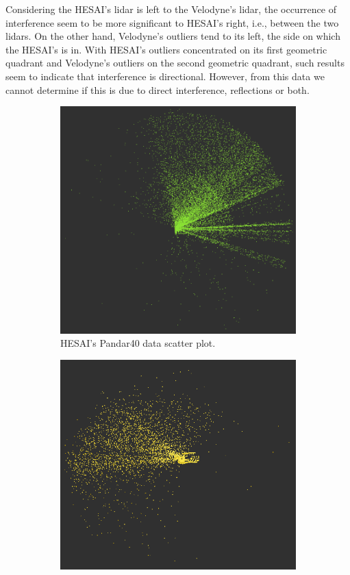 Considering the HESAI's \ac{lidar} is left to the Velodyne's \ac{lidar}, the occurrence of interference seem to be more significant to HESAI's right, i.e., between the two \acp{lidar}. On the other hand, Velodyne's outliers tend to its left, the side on which the HESAI's is in. With HESAI's outliers concentrated on its first geometric quadrant and Velodyne's outliers on the second geometric quadrant, such results seem to indicate that interference is directional. However, from this data we cannot determine if this is due to direct interference, reflections or both.

\begin{figure}[ht!]
\centering
\begin{subfigure}[t]{0.45\textwidth}
	\includegraphics[width=\textwidth]{img/bosch/pandar40.png}
	\caption{HESAI's Pandar40 data scatter plot.}
	\label{fig:bosch-pandar40}
\end{subfigure}
\qquad
\begin{subfigure}[t]{0.45\textwidth}
	\includegraphics[width=\textwidth]{img/bosch/vlp16-test1.png}

\end{subfigure}
\end{figure}
